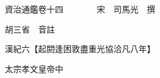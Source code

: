 










 


 
 


 

  
  
  
  
  





  
  
  
  
  
 
  

  

  
  
  



  

 
 

  
   




  

  
  


  　　資治通鑑卷十四　　　　宋　司馬光　撰

　　胡三省　音註

　　漢紀六【起閼逢困敦盡重光協洽凡八年】

　　太宗孝文皇帝中

